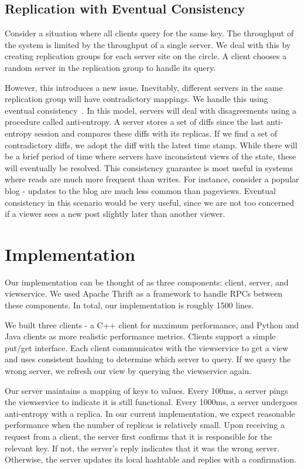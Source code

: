 \documentclass[letterpaper,8pt]{article}
\begin{document}
     \subsection{Replication with Eventual Consistency}
     Consider a situation where all clients query for the same key.
     The throughput of the system is limited by the throughput of a single server.
     We deal with this by creating replication groups for each server site on the circle.
     A client chooses a random server in the replication group to handle its query.

     However, this introduces a new issue.
     Inevitably, different servers in the same replication group will have contradictory mappings.
     We handle this using eventual consistency~\cite{bayou}.
     In this model, servers will deal with disagreements using a procedure called anti-entropy.
     A server stores a set of diffs since the last anti-entropy session and compares these diffs with its replicas.
     If we find a set of contradictory diffs, we adopt the diff with the latest time stamp.
     While there will be a brief period of time where servers have inconsistent views of the state, these will eventually be resolved.
     This consistency guarantee is most useful in systems where reads are much more frequent than writes.
     For instance, consider a popular blog - updates to the blog are much less common than pageviews.
     Eventual consistency in this scenario would be very useful, since we are not too concerned if a viewer sees a new post slightly later than another viewer.


     \section{Implementation}
     Our implementation can be thought of as three components: client, server, and viewservice.
     We used Apache Thrift as a framework to handle RPCs between these components.
     In total, our implementation is roughly 1500 lines.

     We built three clients - a C++ client for maximum performance, and Python and Java clients as more realistic performance metrics.
     Clients support a simple put/get interface.
     Each client communicates with the viewservice to get a view and uses consistent hashing to determine which server to query.
     If we query the wrong server, we refresh our view by querying the viewservice again.

     Our server maintains a mapping of keys to values.
     Every 100ms, a server pings the viewservice to indicate it is still functional.
     Every 1000ms, a server undergoes anti-entropy with a replica.
     In our current implementation, we expect reasonable performance when the number of replicas is relatively small.
     Upon receiving a request from a client, the server first confirms that it is responsible for the relevant key.
     If not, the server's reply indicates that it was the wrong server.
     Otherwise, the server updates its local hashtable and replies with a confirmation.
\end{document}
